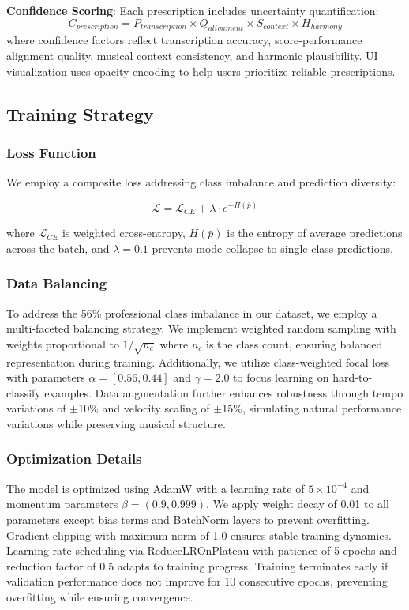 \documentclass[sigconf,review,anonymous]{acmart}
\begin{document}
\textbf{Confidence Scoring}: Each prescription includes uncertainty quantification:
\begin{equation}
C_{prescription} = P_{transcription} \times Q_{alignment} \times S_{context} \times H_{harmony}
\end{equation}
where confidence factors reflect transcription accuracy, score-performance alignment quality, musical context consistency, and harmonic plausibility. UI visualization uses opacity encoding to help users prioritize reliable prescriptions.

\subsection{Training Strategy}

\subsubsection{Loss Function}
We employ a composite loss addressing class imbalance and prediction diversity:

\begin{equation}
\mathcal{L} = \mathcal{L}_{CE} + \lambda \cdot e^{-H(\bar{p})}
\end{equation}

where $\mathcal{L}_{CE}$ is weighted cross-entropy, $H(\bar{p})$ is the entropy of average predictions across the batch, and $\lambda=0.1$ prevents mode collapse to single-class predictions.

\subsubsection{Data Balancing}
To address the 56\% professional class imbalance in our dataset, we employ a multi-faceted balancing strategy. We implement weighted random sampling with weights proportional to $1/\sqrt{n_c}$ where $n_c$ is the class count, ensuring balanced representation during training. Additionally, we utilize class-weighted focal loss with parameters $\alpha=[0.56, 0.44]$ and $\gamma=2.0$ to focus learning on hard-to-classify examples. Data augmentation further enhances robustness through tempo variations of $\pm$10\% and velocity scaling of $\pm$15\%, simulating natural performance variations while preserving musical structure.

\subsubsection{Optimization Details}
The model is optimized using AdamW with a learning rate of $5 \times 10^{-4}$ and momentum parameters $\beta=(0.9, 0.999)$. We apply weight decay of 0.01 to all parameters except bias terms and BatchNorm layers to prevent overfitting. Gradient clipping with maximum norm of 1.0 ensures stable training dynamics. Learning rate scheduling via ReduceLROnPlateau with patience of 5 epochs and reduction factor of 0.5 adapts to training progress. Training terminates early if validation performance does not improve for 10 consecutive epochs, preventing overfitting while ensuring convergence.
\end{document}
